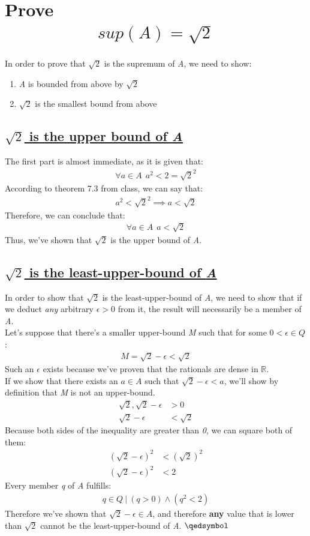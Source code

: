 \documentclass[a4paper, 12pt]{article}
\newcommand{\sub}[1]{\subsection{\underline{#1}}}
\newcommand{\R}{\ensuremath{\mathbb{R}}}
\newcommand{\eq}[1]{\begin{align*}#1\end{align*}}
\renewcommand{\qed}{\hfill\(\qedsymbol\)}
\begin{document}
\section{Prove \eq{sup(A)=\sqrt{2}}}
In order to prove that $\sqrt{2}$ is the supremum of \textit{A}, we need to show:
    \begin{enumerate}
        \item \textit{A} is bounded from above by $\sqrt{2}$
        \item $\sqrt{2}$ is the smallest bound from above
    \end{enumerate}
\sub{$\sqrt{2}$ is the upper bound of \textit{A}}
The first part is almost immediate, as it is given that:
\eq{
    \forall{a}\in{A}~~a^2<2=\sqrt{2}^2
}
According to theorem 7.3 from class, we can say that:
\eq{
    a^2<\sqrt{2}^2\implies a<\sqrt{2}
}
Therefore, we can conclude that:
\eq{
    \forall{a}\in{A}~~a<\sqrt{2}
}
Thus, we've shown that $\sqrt{2}$ is the upper bound of \textit{A}.
\sub{$\sqrt{2}$ is the least-upper-bound of \textit{A}}
In order to show that $\sqrt{2}$ is the least-upper-bound of \textit{A},
we need to show that if we deduct \textit{any} arbitrary $\epsilon>0$ from it, the result will necessarily be a member of \textit{A}.\\
Let's suppose that there's a smaller upper-bound \textit{M} such that for some $0<\epsilon\in{Q}$:
\eq{
    M=\sqrt{2}-\epsilon<\sqrt{2}
}
Such an $\epsilon$ exists because we've proven that the rationals are dense in \R.\\
If we show that there exists an $a\in{A}$ such that $\sqrt{2}-\epsilon<a$, we'll show by definition that \textit{M} is not an upper-bound.
\eq{
    \sqrt{2},\sqrt{2}-\epsilon&>0\\
    \sqrt{2}-\epsilon&<\sqrt{2}
}
Because both sides of the inequality are greater than \textit{0}, we can square both of them:
\eq{
    (\sqrt{2}-\epsilon)^2&<(\sqrt{2})^2\\
    (\sqrt{2}-\epsilon)^2&<2
}
Every member \textit{q} of \textit{A} fulfills:
\eq{
q\in{Q} ~|~ (q>0) \land (q^2<2)
}
Therefore we've shown that $\sqrt{2}-\epsilon\in{A}$, and therefore \textbf{any} value that is lower than $\sqrt{2}$
cannot be the least-upper-bound of \textit{A}.
\qed\pagebreak

\end{document}
